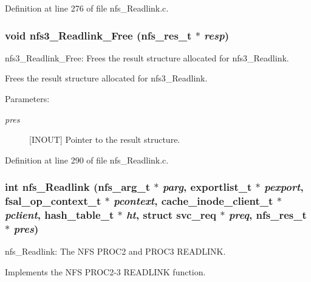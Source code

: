 Definition at line 276 of file nfs\_\-Readlink.c.
\subsubsection{\setlength{\rightskip}{0pt plus 5cm}void nfs3\_\-Readlink\_\-Free (nfs\_\-res\_\-t $\ast$ {\em resp})}\label{nfs__Readlink_8c_a2}


nfs3\_\-Readlink\_\-Free: Frees the result structure allocated for nfs3\_\-Readlink.

Frees the result structure allocated for nfs3\_\-Readlink.

\begin{Desc}
\item[Parameters:]
\begin{description}
\item[{\em pres}][INOUT] Pointer to the result structure. \end{description}
\end{Desc}


Definition at line 290 of file nfs\_\-Readlink.c.
\subsubsection{\setlength{\rightskip}{0pt plus 5cm}int nfs\_\-Readlink (nfs\_\-arg\_\-t $\ast$ {\em parg}, exportlist\_\-t $\ast$ {\em pexport}, fsal\_\-op\_\-context\_\-t $\ast$ {\em pcontext}, cache\_\-inode\_\-client\_\-t $\ast$ {\em pclient}, hash\_\-table\_\-t $\ast$ {\em ht}, struct svc\_\-req $\ast$ {\em preq}, nfs\_\-res\_\-t $\ast$ {\em pres})}\label{nfs__Readlink_8c_a0}


nfs\_\-Readlink: The NFS PROC2 and PROC3 READLINK.

Implements the NFS PROC2-3 READLINK function.

